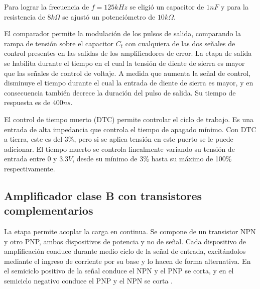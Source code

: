Para lograr la frecuencia de $f=125kHz$ se eligió un capacitor de $1nF$ y para la resistencia de $8k\Omega$ se ajustó un potenciómetro de $10k\Omega$. 

El comparador permite la modulación de los pulsos de salida, comparando la rampa de tensión sobre el capacitor $C_t$ con cualquiera de las dos señales de control presentes en las salidas de los amplificadores de error.
La etapa de salida se habilita durante el tiempo en el cual la tensión de diente de sierra es mayor que las señales de control de voltaje. 
A medida que aumenta la señal de control, disminuye el tiempo durante el cual la entrada de diente de sierra es mayor, y en consecuencia también decrece la duración del pulso de salida. 
Su tiempo de respuesta es de $400ns$.

El control de tiempo muerto (DTC) permite controlar el ciclo de trabajo. 
Es una entrada de alta impedancia que controla el tiempo de apagado mínimo. Con DTC a tierra, este es del 3\%, pero si se aplica tensión en este puerto se le puede adicionar.
El tiempo muerto se controla linealmente variando su tensión de entrada entre $0$ y $3.3V$, desde su mínimo de 3\% hasta su máximo de 100\% respectivamente. 




\subsection{Amplificador clase B con transistores complementarios}

La etapa permite acoplar la carga en continua. 
Se compone de un transistor NPN y otro PNP, ambos dispositivos de potencia y no de señal. 
Cada dispositivo de amplificación conduce durante medio ciclo de la señal de entrada, 
excitándolos mediante el ingreso de corriente por su base y lo hacen de forma alternativa. 
En el semiciclo positivo de la señal conduce el NPN y el PNP se corta, y en el semiciclo negativo conduce el PNP y el NPN se corta \cite{Gi}.

